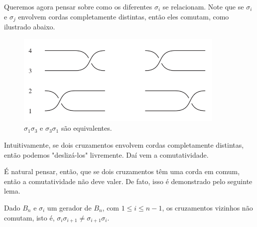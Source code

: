 	\par\vspace{0.3cm} Queremos agora pensar sobre como os diferentes $\sigma_i$ se relacionam. Note que se $\sigma_i$ e $\sigma_j$ envolvem cordas completamente distintas, então eles comutam, como ilustrado abaixo.
	
	\begin{figure}[H]
		\captionsetup{justification=centering}
		\begin{center}
			\includegraphics[width=10cm]{Images/comutatividade.png}
		\end{center}\caption{$\sigma_1\sigma_3$ e $\sigma_3\sigma_1$ são equivalentes.}\label{comutatividade de trancas}
	\end{figure}
	
	\par\vspace{0.3cm}
	
	\begin{remark}
		Intuitivamente, se dois cruzamentos envolvem cordas completamente distintas, então podemos "deslizá-los" livremente. Daí vem a comutatividade.
	\end{remark}
	
	\par\vspace{0.3cm} É natural pensar, então, que se dois cruzamentos têm uma corda em comum, então a comutatividade não deve valer. De fato, isso é demonstrado pelo seguinte lema.
	
	\begin{lemma}
		\label{vizinhos nao comutam}
		Dado $B_n$ e $\sigma_i$ um gerador de $B_n$, com $1\leq i\leq n-1$, os cruzamentos vizinhos não comutam, isto é, $\sigma_i\sigma_{i+1}\neq\sigma_{i+1}\sigma_i$.
	\end{lemma}
	
